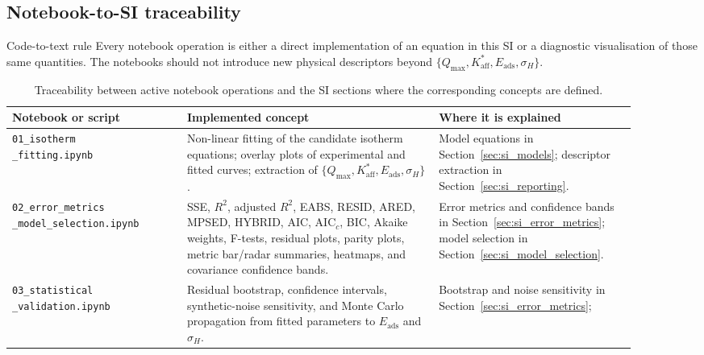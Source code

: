 \documentclass[journal=jacsat,manuscript=article]{achemso}
\begin{document}
\subsection{Notebook-to-SI traceability}
\label{sec:si_notebook_traceability}

\begin{bluebox}{Code-to-text rule}
	Every notebook operation is either a direct implementation of an
	equation in this SI or a diagnostic visualisation of those same
	quantities. The notebooks should not introduce new physical
	descriptors beyond
	\(\{Q_{\max},K_{\mathrm{aff}}^{\ast},E_{\mathrm{ads}},\sigma_H\}\).
\end{bluebox}

\begin{table}[H]
	\centering
	\caption{Traceability between active notebook operations and the
	SI sections where the corresponding concepts are defined.}
	\label{tab:si_notebook_traceability}
	\small
	\begin{tabular}{p{0.25\linewidth}p{0.36\linewidth}p{0.29\linewidth}}
		\toprule
		\textbf{Notebook or script} & \textbf{Implemented concept} &
		\textbf{Where it is explained} \\
		\midrule
		\makecell[l]{\texttt{01\_isotherm}\\\texttt{\_fitting.ipynb}} &
		Non-linear fitting of the candidate isotherm equations;
		overlay plots of experimental and fitted curves; extraction of
		\(\{Q_{\max},K_{\mathrm{aff}}^{\ast},E_{\mathrm{ads}},\sigma_H\}\). &
		Model equations in Section~\ref{sec:si_models}; descriptor
		extraction in Section~\ref{sec:si_reporting}. \\
		\addlinespace
		\makecell[l]{\texttt{02\_error\_metrics}\\\texttt{\_model\_selection.ipynb}} &
		SSE, \(R^2\), adjusted \(R^2\), EABS, RESID, ARED, MPSED,
		HYBRID, AIC, AIC$_c$, BIC, Akaike weights, F-tests, residual
		plots, parity plots, metric bar/radar summaries, heatmaps, and
		covariance confidence bands. &
		Error metrics and confidence bands in Section~\ref{sec:si_error_metrics};
		model selection in Section~\ref{sec:si_model_selection}. \\
		\addlinespace
		\makecell[l]{\texttt{03\_statistical}\\\texttt{\_validation.ipynb}} &
		Residual bootstrap, confidence intervals, synthetic-noise
		sensitivity, and Monte Carlo propagation from fitted parameters
		to \(E_{\mathrm{ads}}\) and \(\sigma_H\). &
		Bootstrap and noise sensitivity in Section~\ref{sec:si_error_metrics};

\end{tabular}
\end{table}
\end{document}
